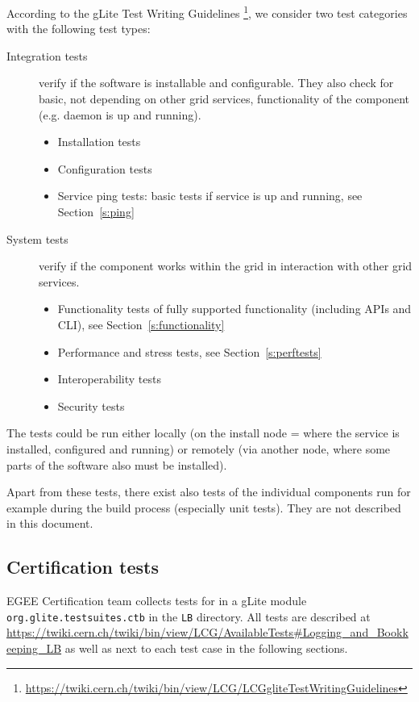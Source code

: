 According to the gLite Test Writing Guidelines
\footnote{\url{https://twiki.cern.ch/twiki/bin/view/LCG/LCGgliteTestWritingGuidelines}},
we consider two test categories with the following test types:

\begin{description}
\item[Integration tests] verify if the software is installable and configurable.
They also check for basic, not depending on other grid services, functionality
of the component (e.g. daemon is up and running).
\begin{itemize}
\item Installation tests %
\item Configuration tests %
\item Service ping tests: basic tests if service is up and running, see Section~\ref{s:ping}
\end{itemize}
%
\item[System tests] verify if the component works within the grid in
interaction with other grid services.
\begin{itemize}
\item Functionality tests of fully supported functionality (including APIs and CLI), see Section~\ref{s:functionality}
\item Performance and stress tests, see Section~\ref{s:perftests}
\item Interoperability tests %
\item Security tests %
\end{itemize}
\end{description}

The tests could be run either locally (on the install node = where the service
is installed, configured and running) or remotely (via another node, where some
parts of the software also must be installed).

Apart from these tests, there exist also tests of the individual components run
for example during the build process (especially unit tests). They are not
described in this document.


\subsection{Certification tests}

EGEE Certification team collects tests for \LB in a gLite module
\verb'org.glite.testsuites.ctb' in the \verb'LB' directory. All \LB tests are
described at
\url{https://twiki.cern.ch/twiki/bin/view/LCG/AvailableTests#Logging_and_Bookkeeping_LB}
as well as next to each test case in the following sections.


